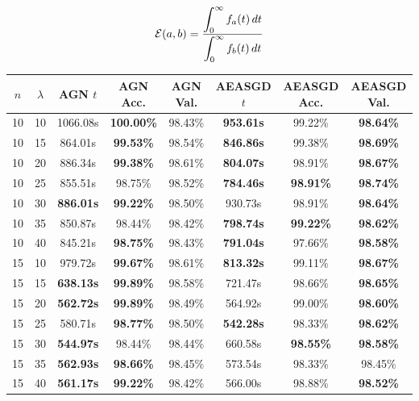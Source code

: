 \begin{equation}
  \label{eq:temporal_efficiency}
  \mathcal{E}(a,b) = \frac{\displaystyle \int_0^\infty f_a(t) \,dt}{\displaystyle \int_0^\infty f_b(t) \,dt}
\end{equation}

\begin{table}
  \centering
  \begin{tabular}{|c|c|c|c|c|c|c|c|}
    \hline
    $n$ & $\lambda$ & \textsc{AGN} $t$ & \textsc{AGN} Acc. & \textsc{AGN} Val. & \textsc{AEASGD} $t$ & \textsc{AEASGD} Acc. & \textsc{AEASGD} Val. \\
    \hline
    \hline
10 & 10 & 1066.08s & \textbf{100.00\%} & 98.43\% & \textbf{953.61s} & 99.22\% & \textbf{98.64\%}  \\
\hline
10 & 15 & 864.01s & \textbf{99.53\%} & 98.54\% & \textbf{846.86s} & 99.38\% & \textbf{98.69\%}  \\
\hline
10 & 20 & 886.34s & \textbf{99.38\%} & 98.61\% & \textbf{804.07s} & 98.91\% & \textbf{98.67\%}  \\
\hline
10 & 25 & 855.51s & 98.75\% & 98.52\% & \textbf{784.46s} & \textbf{98.91\%} & \textbf{98.74\%}  \\
\hline
10 & 30 & \textbf{886.01s} & \textbf{99.22\%} & 98.50\% & 930.73s & 98.91\% & \textbf{98.64\%}  \\
\hline
10 & 35 & 850.87s & 98.44\% & 98.42\% & \textbf{798.74s} & \textbf{99.22\%} & \textbf{98.62\%}  \\
\hline
10 & 40 & 845.21s & \textbf{98.75\%} & 98.43\% & \textbf{791.04s} & 97.66\% & \textbf{98.58\%}  \\
\hline
15 & 10 & 979.72s & \textbf{99.67\%} & 98.61\% & \textbf{813.32s} & 99.11\% & \textbf{98.67\%}  \\
\hline
15 & 15 & \textbf{638.13s} & \textbf{99.89\%} & 98.58\% & 721.47s & 98.66\% & \textbf{98.65\%}  \\
\hline
15 & 20 & \textbf{562.72s} & \textbf{99.89\%} & 98.49\% & 564.92s & 99.00\% & \textbf{98.60\%}  \\
\hline
15 & 25 & 580.71s & \textbf{98.77\%} & 98.50\% & \textbf{542.28s} & 98.33\% & \textbf{98.62\%}  \\
\hline
15 & 30 & \textbf{544.97s} & 98.44\% & 98.44\% & 660.58s & \textbf{98.55\%} & \textbf{98.58\%}  \\
\hline
15 & 35 & \textbf{562.93s} & \textbf{98.66\%} & 98.45\% & 573.54s & 98.33\% & 98.45\%  \\
\hline
15 & 40 & \textbf{561.17s} & \textbf{99.22\%} & 98.42\% & 566.00s & 98.88\% & \textbf{98.52\%}  \\

\end{tabular}
\end{table}
